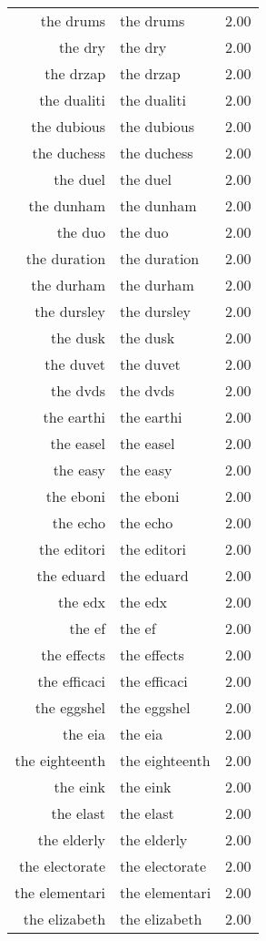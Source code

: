 \begin{table}[ht]
\begin{tabular}{rlr}
  the drums & the drums & 2.00 \\ 
  the dry & the dry & 2.00 \\ 
  the drzap & the drzap & 2.00 \\ 
  the dualiti & the dualiti & 2.00 \\ 
  the dubious & the dubious & 2.00 \\ 
  the duchess & the duchess & 2.00 \\ 
  the duel & the duel & 2.00 \\ 
  the dunham & the dunham & 2.00 \\ 
  the duo & the duo & 2.00 \\ 
  the duration & the duration & 2.00 \\ 
  the durham & the durham & 2.00 \\ 
  the dursley & the dursley & 2.00 \\ 
  the dusk & the dusk & 2.00 \\ 
  the duvet & the duvet & 2.00 \\ 
  the dvds & the dvds & 2.00 \\ 
  the earthi & the earthi & 2.00 \\ 
  the easel & the easel & 2.00 \\ 
  the easy & the easy & 2.00 \\ 
  the eboni & the eboni & 2.00 \\ 
  the echo & the echo & 2.00 \\ 
  the editori & the editori & 2.00 \\ 
  the eduard & the eduard & 2.00 \\ 
  the edx & the edx & 2.00 \\ 
  the ef & the ef & 2.00 \\ 
  the effects & the effects & 2.00 \\ 
  the efficaci & the efficaci & 2.00 \\ 
  the eggshel & the eggshel & 2.00 \\ 
  the eia & the eia & 2.00 \\ 
  the eighteenth & the eighteenth & 2.00 \\ 
  the eink & the eink & 2.00 \\ 
  the elast & the elast & 2.00 \\ 
  the elderly & the elderly & 2.00 \\ 
  the electorate & the electorate & 2.00 \\ 
  the elementari & the elementari & 2.00 \\ 
  the elizabeth & the elizabeth & 2.00 \\ 

\end{tabular}
\end{table}
